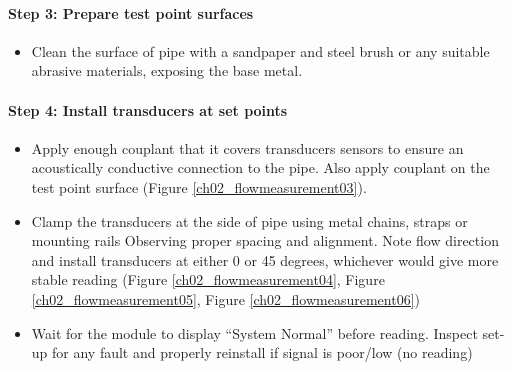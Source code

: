 \paragraph{Step 3: Prepare test point surfaces}
\begin{itemize}
	\item Clean the surface of pipe with a sandpaper and steel brush or any suitable abrasive materials, exposing the base metal.
	
\end{itemize}

\paragraph{Step 4: Install transducers at set points}
\begin{itemize}
	\item Apply enough couplant that it covers transducers sensors to ensure an acoustically conductive connection to the pipe. Also apply couplant on the test point surface (Figure \ref{ch02_flowmeasurement03}).
	\item Clamp the transducers at the side of pipe using metal chains, straps or mounting rails Observing proper spacing and alignment. Note flow direction and install transducers at either 0 or 45 degrees, whichever would give more stable reading (Figure \ref{ch02_flowmeasurement04}, Figure \ref{ch02_flowmeasurement05}, Figure \ref{ch02_flowmeasurement06})
	\item Wait for the module to display “System Normal” before reading. Inspect set-up for any fault and properly reinstall if signal is poor/low (no reading)
\end{itemize}

